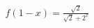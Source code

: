 \documentclass[preview]{standalone}
\begin{document}
\begin{align*}
f(1-x) = \frac{\sqrt{2}}{\sqrt{2} + 2^x}
\end{align*}
\end{document}
